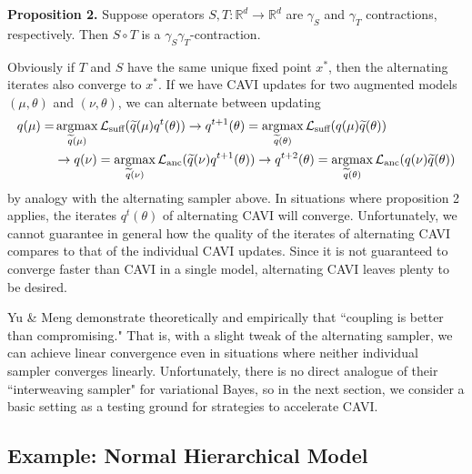 \documentclass{article}
\begin{document}
{\bf Proposition 2.} Suppose operators $S,T:\mathbb R^d\to\mathbb R^d$ are $\gamma_S$ and $\gamma_T$ contractions, respectively. Then $S\circ T$ is a $\gamma_S\gamma_T$-contraction. %

Obviously if $T$ and $S$ have the same unique fixed point $x^*$, then the alternating iterates also converge to $x^*$. If we have CAVI updates for two augmented models $(\mu,\theta)$ and $(\nu,\theta)$, we can alternate between updating 
\begin{align*}
q(\mu) = &\mathop{\mathrm{argmax}}_{\widetilde q(\mu)} \mathcal L_\text{suff}(\widetilde q(\mu) q^t(\theta)) 
\to q^{t+1}(\theta) = \mathop{\mathrm{argmax}}_{\widetilde q(\theta)} \mathcal L_\text{suff}(q(\mu) \widetilde q(\theta)) \\
&\to q(\nu) = \mathop{\mathrm{argmax}}_{\widetilde q(\nu)} \mathcal L_\text{anc}(\widetilde q(\nu) q^{t+1}(\theta)) 
\to q^{t+2}(\theta) = \mathop{\mathrm{argmax}}_{\widetilde q(\theta)} \mathcal L_\text{anc}(q(\nu) \widetilde q(\theta)) 
\end{align*}
by analogy with the alternating sampler above. In situations where proposition 2 applies, the iterates $q^t(\theta)$ of alternating CAVI will converge. Unfortunately, we cannot guarantee in general how the quality of the iterates of alternating CAVI compares to that of the individual CAVI updates. Since it is not guaranteed to converge faster than CAVI in a single model, alternating CAVI leaves plenty to be desired. %

Yu \& Meng \cite{Yu} demonstrate theoretically and empirically that ``coupling is better than compromising." That is, with a slight tweak of the alternating sampler, we can achieve linear convergence even in situations where neither individual sampler converges linearly. Unfortunately, there is no direct analogue of their ``interweaving sampler" for variational Bayes, so in the next section, we consider a basic setting as a testing ground for strategies to accelerate CAVI.

\subsection{Example: Normal Hierarchical Model} 
\end{document}
